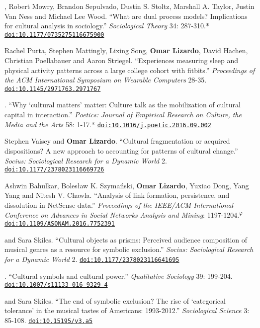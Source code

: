 
, Robert Mowry, Brandon Sepulvado, Dustin S. Stoltz, Marshall A. Taylor, Justin Van Ness and Michael Lee Wood. ``What are dual process models? Implications for cultural analysis in sociology.'' {\em Sociological Theory} 34: 287-310.\textcolor{uclablue}{*} \href{https://doi.org/10.1177/0735275116675900}{\nolinkurl{doi:10.1177/0735275116675900}}

\ind Rachel Purta, Stephen Mattingly, Lixing Song, {\bf Omar Lizardo}, David Hachen, Christian Poellabauer and  Aaron Striegel. ``Experiences measuring sleep and physical activity patterns across a large college cohort with fitbits.'' {\em Proceedings of the ACM International Symposium on Wearable Computers} 28-35. \href{https://doi.org/10.1145/2971763.2971767}{\nolinkurl{doi:10.1145/2971763.2971767}}

. ``Why `cultural matters' matter: Culture talk as the mobilization of cultural capital in interaction.'' {\em Poetics: Journal of Empirical Research on Culture, the Media and the Arts} 58: 1-17.\textcolor{uclablue}{*} \href{https://doi.org/10.1016/j.poetic.2016.09.002}{\nolinkurl{doi:10.1016/j.poetic.2016.09.002}}

\ind Stephen Vaisey and {\bf Omar Lizardo}. ``Cultural fragmentation or acquired dispositions? A new approach to accounting for patterns of cultural change.'' {\em Socius: Sociological Research for a Dynamic World} 2. \href{https://doi.org/10.1177/2378023116669726}{\nolinkurl{doi:10.1177/2378023116669726}}

\ind Ashwin	Bahulkar, Boles\l{}aw K. Szyma\'{n}ski, {\bf Omar Lizardo}, Yuxiao Dong, Yang Yang and Nitesh V. Chawla. ``Analysis of link formation, persistence, and dissolution in NetSense data.'' {\em Proceedings of the IEEE/ACM International Conference on Advances in Social Networks Analysis and Mining}: 1197-1204.\textcolor{black}{$^{\varphi}$} \href{https://doi.org/10.1109/ASONAM.2016.7752391}{\nolinkurl{doi:10.1109/ASONAM.2016.7752391}}

 and Sara Skiles. ``Cultural objects as prisms: Perceived audience composition of musical genres as a resource for symbolic exclusion.'' {\em Socius: Sociological Research for a Dynamic World} 2. \href{https://doi.org/10.1177/2378023116641695}{\nolinkurl{doi:10.1177/2378023116641695}}

. ``Cultural symbols and cultural power.'' {\em Qualitative Sociology} 39: 199-204.  \href{https://doi.org/10.1007/s11133-016-9329-4}{\nolinkurl{doi:10.1007/s11133-016-9329-4}}

 and Sara Skiles. ``The end of symbolic exclusion? The rise of `categorical tolerance' in the musical tastes of Americans: 1993-2012.'' {\em Sociological Science} 3: 85-108. \href{https://doi.org/10.15195/v3.a5}{\nolinkurl{doi:10.15195/v3.a5}}